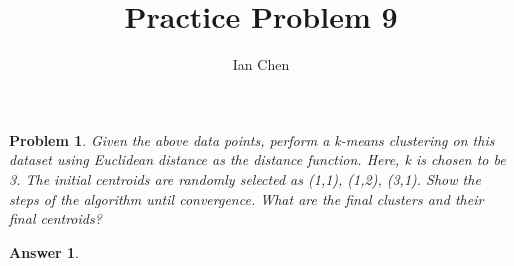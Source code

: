 \documentclass[11pt]{article}
\author{Ian Chen}
\title{Practice Problem 9}
\theoremstyle{description}
\newtheorem{problem}{Problem}
\theoremstyle{break}
\newtheorem*{answer}{Answer}
\begin{document}
    \maketitle

    \begin{problem}
        Given the above data points, perform a k-means clustering on this dataset using Euclidean
        distance as the distance function.
        Here, k is chosen to be 3.
        The initial centroids are randomly selected as (1,1), (1,2), (3,1).
        Show the steps of the algorithm until convergence.
        What are the final clusters and their final centroids?
    \end{problem}
    \begin{answer}
    \end{answer}
\end{document}
